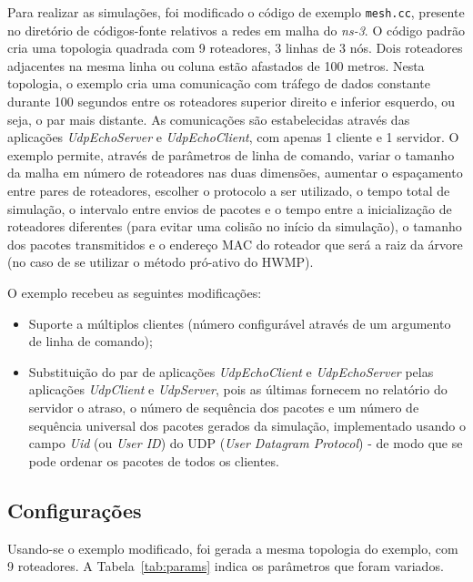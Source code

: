 \documentclass[letterpaper, 10 pt, conference]{ieeeconf}  %
\begin{document}
Para realizar as simulações, foi modificado o código de exemplo \texttt{mesh.cc}, presente no diretório de códigos-fonte relativos a redes em malha do \textit{ns-3}. O código padrão cria uma topologia quadrada com 9 roteadores, 3 linhas de 3 nós. Dois roteadores adjacentes na mesma linha ou coluna estão afastados de 100 metros. Nesta topologia, o exemplo cria uma comunicação com tráfego de dados constante durante 100 segundos entre os roteadores superior direito e inferior esquerdo, ou seja, o par mais distante. As comunicações são estabelecidas através das aplicações \textit{UdpEchoServer} e \textit{UdpEchoClient}, com apenas 1 cliente e 1 servidor. O exemplo permite, através de parâmetros de linha de comando, variar o tamanho da malha em número de roteadores nas duas dimensões, aumentar o espaçamento entre pares de roteadores, escolher o protocolo a ser utilizado, o tempo total de simulação, o intervalo entre envios de pacotes e o tempo entre a inicialização de roteadores diferentes (para evitar uma colisão no início da simulação), o tamanho dos pacotes transmitidos e o endereço MAC do roteador que será a raiz da árvore (no caso de se utilizar o método pró-ativo do HWMP).

O exemplo recebeu as seguintes modificações:

\begin{itemize}
	\item Suporte a múltiplos clientes (número configurável através de um argumento de linha de comando);
    \item Substituição do par de aplicações \textit{UdpEchoClient} e \textit{UdpEchoServer} pelas aplicações \textit{UdpClient} e \textit{UdpServer}, pois as últimas fornecem no relatório do servidor o atraso, o número de sequência dos pacotes e um número de sequência universal dos pacotes gerados da simulação, implementado usando o campo \textit{Uid} (ou \textit{User ID}) do UDP (\textit{User Datagram Protocol}) - de modo que se pode ordenar os pacotes de todos os clientes.
\end{itemize}

\subsection{Configurações}

Usando-se o exemplo modificado, foi gerada a mesma topologia do exemplo, com 9 roteadores. A Tabela~\ref{tab:params} indica os parâmetros que foram variados.
\end{document}
